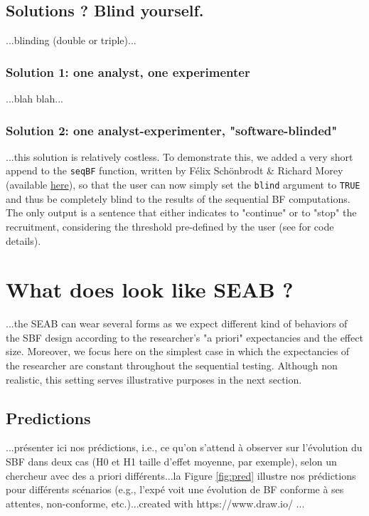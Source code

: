 \documentclass[a4paper,man,natbib,floatsintext]{apa6}
\begin{document}
\subsection{Solutions ? Blind yourself.}

...blinding (double or triple)...

\subsubsection{Solution 1: one analyst, one experimenter}

...blah blah...

\subsubsection{Solution 2: one analyst-experimenter, "software-blinded"}

...this solution is relatively costless. To demonstrate this, we added a very short append to the \texttt{seqBF} function, written by Félix Schönbrodt \& Richard Morey (available \href{https://raw.githubusercontent.com/richarddmorey/BayesFactorExtras/master/BayesFactorExtras/R/seqBF.R}{here}), so that the user can now simply set the \texttt{blind} argument to \texttt{TRUE} and thus be completely blind to the results of the sequential BF computations. The only output is a sentence that either indicates to "continue" or to "stop" the recruitment, considering the threshold pre-defined by the user (see  for code details).

\section{What does look like SEAB ?}

...the SEAB can wear several forms as we expect different kind of behaviors of the SBF design according to the researcher's "a priori" expectancies and the effect size. Moreover, we focus here on the simplest case in which the expectancies of the researcher are constant throughout the sequential testing. Although non realistic, this setting serves illustrative purposes in the next section.

\subsection{Predictions}

...présenter ici nos prédictions, i.e., ce qu'on s'attend à observer sur l'évolution du SBF dans deux cas (H0 et H1 taille d'effet moyenne, par exemple), selon un chercheur avec des a priori différents...la Figure \ref{fig:pred} illustre nos prédictions pour différents scénarios (e.g., l'expé voit une évolution de BF conforme à ses attentes, non-conforme, etc.)...created with https://www.draw.io/ ...
\end{document}
